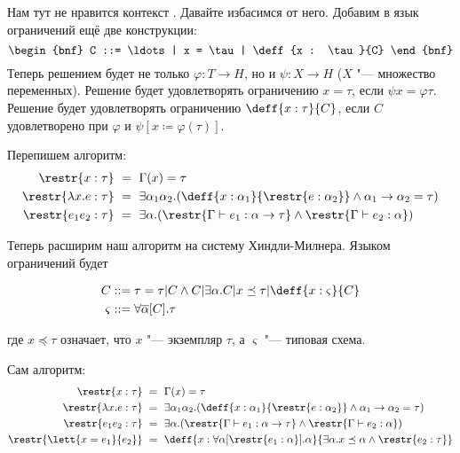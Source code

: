 Нам тут не нравится контекст \todo. Давайте избасимся от него.
Добавим в язык ограничений ещё две конструкции:
\[
\begin{bnf}
    C ::= \ldots | x = \tau | \deff{x : \tau}{C}
\end{bnf}
\]
Теперь решением будет не только $\varphi : T \rightarrow H$, но и $\psi : X \rightarrow H$ ($X$ "--- множество переменных).
Решение будет удовлетворять ограничению $x = \tau$, если $\psi x = \varphi \tau$.
Решение будет удовлетворять ограничению $\deff{x:\tau}{C}$, если $C$ удовлетворено при $\varphi$ и $\psi[x \coloneqq \varphi(\tau)]$.

Перепишем алгоритм:
\begin{align*}
    \restr{x : \tau} \ &=\  \Gamma(x) = \tau \\
    \restr{\lambda x . e : \tau} \ &=\ 
        \exists \alpha_1 \alpha_2 . (\deff{x : \alpha_1}{\restr{e:\alpha_2}} \land \alpha_1\rightarrow\alpha_2=\tau) \\
    \restr{e_1 e_2 : \tau} \ &=\ 
        \exists\alpha.(\restr{\Gamma\vdash e_1 :\alpha\rightarrow\tau} \land \restr{\Gamma\vdash e_2 : \alpha})
\end{align*}

Теперь расширим наш алгоритм на систему Хиндли-Милнера. Языком ограничений будет
\begin{bnf}
\begin{align*}
    C &::= \tau = \tau | C \land C | \exists \alpha . C | x \preceq \tau | \deff{x : \varsigma}{C} \\
    \varsigma &::= \forall \overline\alpha[C] . \tau
\end{align*}
\end{bnf}
где $x \preceq \tau$ означает, что $x$ "--- экземпляр $\tau$, а $\varsigma$ "--- типовая схема.

Сам алгоритм:
\begin{align*}
    \restr{x : \tau} \ &=\  \Gamma(x) = \tau \\
    \restr{\lambda x . e : \tau} \ &=\ 
        \exists \alpha_1 \alpha_2 . (\deff{x : \alpha_1}{\restr{e:\alpha_2}} \land \alpha_1\rightarrow\alpha_2=\tau) \\
    \restr{e_1 e_2 : \tau} \ &=\ 
        \exists\alpha.(\restr{\Gamma\vdash e_1 :\alpha\rightarrow\tau} \land \restr{\Gamma\vdash e_2 : \alpha}) \\
    \restr{\lett{x = e_1}{e_2}} \ &=\ \deff{x : \forall \alpha[\restr{e_1 : \alpha}].\alpha}
        {\exists \alpha . x \preceq \alpha \land \restr{e_2:\tau}}
\end{align*}
\todo

